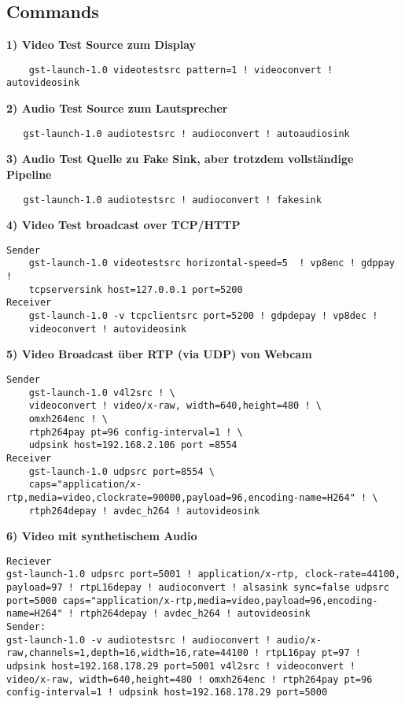 \subsection{Commands}
\textbf{1) Video Test Source zum Display}
\begin{verbatim}
    gst-launch-1.0 videotestsrc pattern=1 ! videoconvert ! autovideosink
\end{verbatim}

\textbf{2) Audio Test Source zum Lautsprecher}
\begin{verbatim}
   gst-launch-1.0 audiotestsrc ! audioconvert ! autoaudiosink
\end{verbatim}

\textbf{3) Audio Test Quelle zu Fake Sink, aber trotzdem vollständige Pipeline}
\begin{verbatim}
   gst-launch-1.0 audiotestsrc ! audioconvert ! fakesink
\end{verbatim}

\textbf{4) Video Test broadcast over TCP/HTTP}
\begin{verbatim}
Sender
    gst-launch-1.0 videotestsrc horizontal-speed=5  ! vp8enc ! gdppay !
    tcpserversink host=127.0.0.1 port=5200
Receiver
    gst-launch-1.0 -v tcpclientsrc port=5200 ! gdpdepay ! vp8dec !
    videoconvert ! autovideosink
\end{verbatim}

\textbf{5) Video Broadcast über RTP (via UDP) von Webcam}
\begin{verbatim}
Sender
    gst-launch-1.0 v4l2src ! \
	videoconvert ! video/x-raw, width=640,height=480 ! \
	omxh264enc ! \
    rtph264pay pt=96 config-interval=1 ! \
    udpsink host=192.168.2.106 port =8554
Receiver
    gst-launch-1.0 udpsrc port=8554 \
	caps="application/x-					  rtp,media=video,clockrate=90000,payload=96,encoding-name=H264" ! \
	rtph264depay ! avdec_h264 ! autovideosink
\end{verbatim}

\textbf{6) Video mit synthetischem Audio}
\begin{verbatim}
Reciever
gst-launch-1.0 udpsrc port=5001 ! application/x-rtp, clock-rate=44100, payload=97 ! rtpL16depay ! audioconvert ! alsasink sync=false udpsrc port=5000 caps="application/x-rtp,media=video,payload=96,encoding-name=H264" ! rtph264depay ! avdec_h264 ! autovideosink
Sender:
gst-launch-1.0 -v audiotestsrc ! audioconvert ! audio/x-raw,channels=1,depth=16,width=16,rate=44100 ! rtpL16pay pt=97 ! udpsink host=192.168.178.29 port=5001 v4l2src ! videoconvert ! video/x-raw, width=640,height=480 ! omxh264enc ! rtph264pay pt=96 config-interval=1 ! udpsink host=192.168.178.29 port=5000
\end{verbatim}


